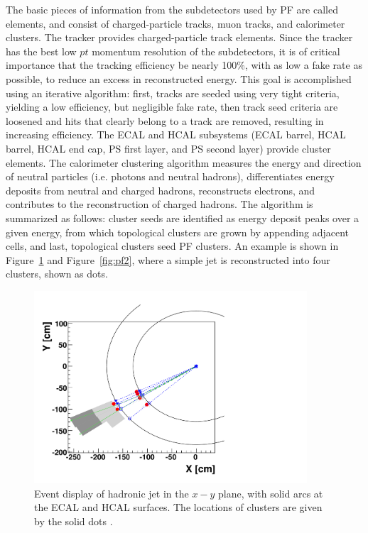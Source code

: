 \indent The basic pieces of information from the subdetectors used by PF are called elements, and consist of charged-particle tracks, muon tracks, and calorimeter clusters. The tracker provides charged-particle track elements. Since the tracker has the best low $pt$ momentum resolution of the subdetectors, it is of critical importance that the tracking efficiency be nearly 100\%, with as low a fake rate as possible, to reduce an excess in reconstructed energy. This goal is accomplished using an iterative algorithm: first, tracks are seeded using very tight criteria, yielding a low efficiency, but negligible fake rate, then track seed criteria are loosened and hits that clearly belong to a track are removed, resulting in increasing efficiency. The ECAL and HCAL subsystems (ECAL barrel, HCAL barrel, HCAL end cap, PS first layer, and PS second layer) provide cluster elements. The calorimeter clustering algorithm measures the energy and direction of neutral particles (i.e. photons and neutral hadrons), differentiates energy deposits from neutral and charged hadrons, reconstructs electrons, and contributes to the reconstruction of charged hadrons. The algorithm is summarized as follows: cluster seeds are identified as energy deposit peaks over a given energy, from which topological clusters are grown by appending adjacent cells, and last, topological clusters seed PF clusters. An example is shown in Figure~\ref{fig:pf1} and Figure~\ref{fig:pf2}, where a simple jet is reconstructed into four clusters, shown as dots. 


\begin{figure}[tbh]
\centering
\includegraphics[width=4in]{figures/PFa.pdf}
\caption{Event display of hadronic jet in the $x-y$ plane, with solid arcs at the ECAL and HCAL surfaces. The locations of clusters are given by the solid dots \cite{CMS:2009nxa}.}
\label{fig:pf1}
\end{figure}

